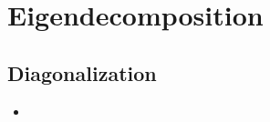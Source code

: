 \chapter{Eigendecomposition}\label{Eigendecomposition}

\section{Diagonalization}\label{Diagonalization}
\begin{itemize}
  \item 
\end{itemize}
